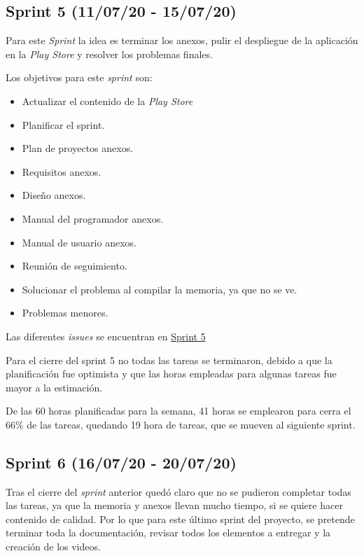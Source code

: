 \subsection{Sprint 5 (11/07/20 - 15/07/20)}\label{sprint-5-11072020---15072020}
Para este \emph{Sprint} la idea es terminar los anexos, pulir el despliegue de la aplicación en la \emph{Play Store} y resolver los problemas finales.

Los objetivos para este \emph{sprint} son:
\begin{itemize}
	\item Actualizar el contenido de la \emph{Play Store}
	\item Planificar el sprint.
	\item Plan de proyectos anexos.
	\item Requisitos anexos.
	\item Diseño anexos.
	\item Manual del programador anexos.
	\item Manual de usuario anexos.
	\item Reunión de seguimiento.
	\item Solucionar el problema al compilar la memoria, ya que no se ve.
	\item Problemas menores.
\end{itemize}

Las diferentes \emph{issues} se encuentran en \href{https://github.com/scc0034/flutter_serpiente/milestone/5?closed=1}{Sprint 5}


Para el cierre del sprint 5 no todas las tareas se terminaron, debido a que la planificación fue optimista y que las horas empleadas para algunas tareas fue mayor a la estimación.

De las 60 horas planificadas para la semana, 41 horas se emplearon para cerra el 66\% de las tareas, quedando 19 hora de tareas, que se mueven al siguiente sprint.

\subsection{Sprint 6 (16/07/20 - 20/07/20)}\label{sprint-6-16072020---20072020}
Tras el cierre del \emph{sprint} anterior quedó claro que no se pudieron completar todas las tareas, ya que la memoria y anexos llevan mucho tiempo, si se quiere hacer contenido de calidad. Por lo que para este último sprint del proyecto, se pretende terminar toda la documentación, revisar todos los elementos a entregar y la creación de los videos.


